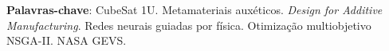 \begin{resumo}
\vspace{\onelineskip}
\noindent
\textbf{Palavras-chave}: CubeSat 1U. Metamateriais auxéticos. \textit{Design for Additive Manufacturing}. Redes neurais guiadas por física. Otimização multiobjetivo NSGA-II. NASA GEVS.
\end{resumo}

